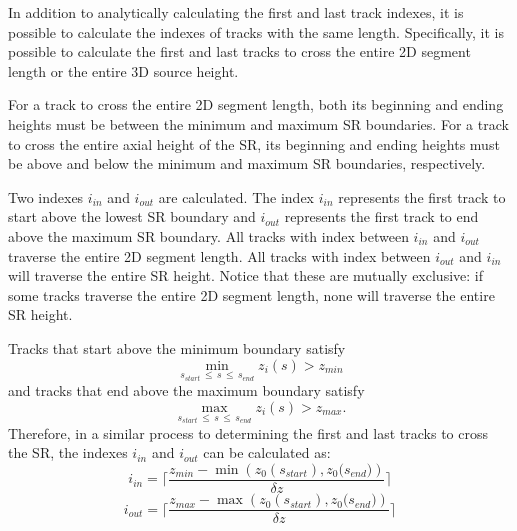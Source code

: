 \begin{appendices}
In addition to analytically calculating the first and last track indexes, it is possible to calculate the indexes of tracks with the same length. Specifically, it is possible to calculate the first and last tracks to cross the entire 2D segment length or the entire 3D source height.

For a track to cross the entire 2D segment length, both its beginning and ending heights must be between the minimum and maximum \ac{SR} boundaries. For a track to cross the entire axial height of the \ac{SR}, its beginning and ending heights must be above and below the minimum and maximum \ac{SR} boundaries, respectively.

Two indexes $i_{\textit{in}}$ and $i_{\textit{out}}$ are calculated. The index $i_{\textit{in}}$ represents the first track to start above the lowest \ac{SR} boundary and $i_{\textit{out}}$ represents the first track to end above the maximum \ac{SR} boundary. All tracks with index between $i_{\textit{in}}$ and $i_{\textit{out}}$ traverse the entire 2D segment length. All tracks with index between $i_{\textit{out}}$ and $i_{\textit{in}}$ will traverse the entire \ac{SR} height. Notice that these are mutually exclusive: if some tracks traverse the entire 2D segment length, none will traverse the entire \ac{SR} height.

Tracks that start above the minimum boundary satisfy
\begin{equation}
\min_{s_{\textit{start}} \, \leq \, s \, \leq \, s_{\textit{end}}} z_i(s) > z_{\textit{min}}
\end{equation}
and tracks that end above the maximum boundary satisfy
\begin{equation}
\max_{s_{\textit{start}} \, \leq \, s \, \leq \, s_{\textit{end}}} z_i(s) > z_{\textit{max}}.
\end{equation}
Therefore, in a similar process to determining the first and last tracks to cross the \ac{SR}, the indexes $i_{\textit{in}}$ and $i_{\textit{out}}$ can be calculated as:
\begin{equation}
i_{\textit{in}} = \Bigg\lceil\frac{z_{\textit{min}} - \min\left({z_0(s_{\textit{start}}), z_0(s_{\textit{end}}})\right) }{\delta z}\Bigg\rceil
\end{equation}
\begin{equation}
i_{\textit{out}} = \Bigg\lceil\frac{z_{\textit{max}} - \max\left({z_0(s_{\textit{start}}), z_0(s_{\textit{end}}})\right) }{\delta z}\Bigg\rceil
\end{equation}




\end{appendices}
